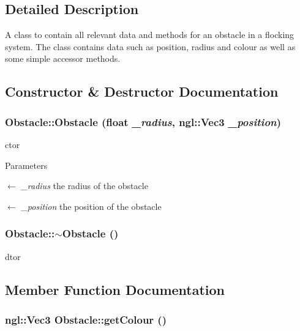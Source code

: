 \subsection{Detailed Description}
A class to contain all relevant data and methods for an obstacle in a flocking system. The class contains data such as position, radius and colour as well as some simple accessor methods. 

\subsection{Constructor \& Destructor Documentation}
\hypertarget{classObstacle_a82fdea9766df325ecf133cd3f558db7c}{
\subsubsection[{Obstacle}]{\setlength{\rightskip}{0pt plus 5cm}Obstacle::Obstacle (float {\em \_\-radius}, \/  ngl::Vec3 {\em \_\-position})}}
\label{classObstacle_a82fdea9766df325ecf133cd3f558db7c}


ctor 
\begin{DoxyParams}{Parameters}
\item[\mbox{$\leftarrow$} {\em \_\-radius}]the radius of the obstacle \item[\mbox{$\leftarrow$} {\em \_\-position}]the position of the obstacle \end{DoxyParams}
\hypertarget{classObstacle_af2f9cc9c6cff75dca0974fd5ac4f71a9}{
\subsubsection[{$\sim$Obstacle}]{\setlength{\rightskip}{0pt plus 5cm}Obstacle::$\sim$Obstacle ()}}
\label{classObstacle_af2f9cc9c6cff75dca0974fd5ac4f71a9}


dtor 

\subsection{Member Function Documentation}
\hypertarget{classObstacle_adfb1ad56541f71efff0c701d7b2bbd0b}{
\subsubsection[{getColour}]{\setlength{\rightskip}{0pt plus 5cm}ngl::Vec3 Obstacle::getColour ()}}
\label{classObstacle_adfb1ad56541f71efff0c701d7b2bbd0b}


